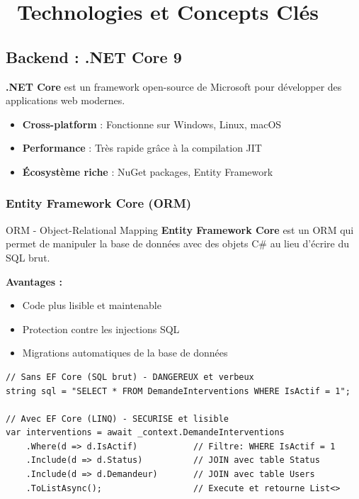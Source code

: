 \documentclass[12pt,a4paper]{article}
\begin{document}
\newpage

\section{\faTools\ Technologies et Concepts Clés}

\subsection{Backend : .NET Core 9}

\begin{dotnetbox}
\textbf{.NET Core} est un framework open-source de Microsoft pour développer des applications web modernes.

\begin{itemize}
    \item \textbf{Cross-platform} : Fonctionne sur Windows, Linux, macOS
    \item \textbf{Performance} : Très rapide grâce à la compilation JIT
    \item \textbf{Écosystème riche} : NuGet packages, Entity Framework
\end{itemize}
\end{dotnetbox}

\subsubsection{Entity Framework Core (ORM)}

\begin{defbox}{ORM - Object-Relational Mapping}
\textbf{Entity Framework Core} est un ORM qui permet de manipuler la base de données avec des objets C\# au lieu d'écrire du SQL brut.

\textbf{Avantages :}
\begin{itemize}
    \item Code plus lisible et maintenable
    \item Protection contre les injections SQL
    \item Migrations automatiques de la base de données
\end{itemize}
\end{defbox}

\begin{lstlisting}[language=CSharp, caption=Exemple Entity Framework - Récupération des interventions]
// Sans EF Core (SQL brut) - DANGEREUX et verbeux
string sql = "SELECT * FROM DemandeInterventions WHERE IsActif = 1";

// Avec EF Core (LINQ) - SECURISE et lisible
var interventions = await _context.DemandeInterventions
    .Where(d => d.IsActif)           // Filtre: WHERE IsActif = 1
    .Include(d => d.Status)          // JOIN avec table Status
    .Include(d => d.Demandeur)       // JOIN avec table Users
    .ToListAsync();                  // Execute et retourne List<>
\end{lstlisting}
\end{document}
